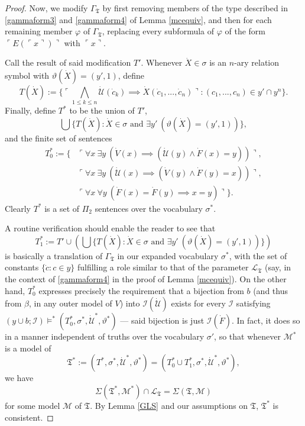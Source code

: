 \documentclass[12pt]{article}
\numberwithin{equation}{section}
\begin{document}
\begin{proof}
Now, we modify $\Gamma_{\mathfrak{T}}$ by first removing members of the type described in \ref{gammaform3} and \ref{gammaform4} of Lemma \ref{mcequiv}, and then for each remaining member $\varphi$ of $\Gamma_{\mathfrak{T}}$, replacing every subformula of $\varphi$ of the form $\ulcorner E(\ulcorner x \urcorner) \urcorner$ with $\ulcorner x \urcorner$. 

Call the result of said modification $T'$. Whenever $\dot{X} \in \sigma$ is an $n$-ary relation symbol with $\vartheta(\dot{X}) = (y', 1)$, define $$T(\dot{X}) := \{\ulcorner \bigwedge_{1 \leq k \leq n} \dot{\mathcal{U}}(\dot{c}_k) \implies \dot{X}(\dot{c}_1, ..., \dot{c}_n) \urcorner : (c_1, ..., c_n) \in y' \cap y^n\}.$$ Finally, define $T^*$ to be the union of $T'$, $$\bigcup \{T(\dot{X}) : \dot{X} \in \sigma \text{ and } \exists y' \ (\vartheta(\dot{X}) = (y', 1))\},$$ and the finite set of sentences
\begin{align*}
    T^*_0 := \{ & \ulcorner \forall x \ \exists y \ (\dot{V}(x) \implies (\dot{\mathcal{U}}(y) \wedge \dot{F}(x) = y)) \urcorner, \\
    & \ulcorner \forall x \ \exists y \ (\dot{\mathcal{U}}(x) \implies (\dot{V}(y) \wedge \dot{F}(y) = x)) \urcorner, \\
    & \ulcorner \forall x \ \forall y \ (\dot{F}(x) = \dot{F}(y) \implies x = y) \urcorner\} \text{.}
\end{align*}
Clearly $T^*$ is a set of $\Pi_2$ sentences over the vocabulary $\sigma^*$.

A routine verification should enable the reader to see that $$T^*_1 := T' \cup (\bigcup \{T(\dot{X}) : \dot{X} \in \sigma \text{ and } \exists y' \ (\vartheta(\dot{X}) = (y', 1))\})$$ is basically a translation of $\Gamma_{\mathfrak{T}}$ in our expanded vocabulary $\sigma^*$, with the set of constants $\{\dot{c} : c \in y\}$ fulfilling a role similar to that of the parameter $\mathcal{L}_{\mathfrak{T}}$ (say, in the context of \ref{gammaform4} in the proof of Lemma \ref{mcequiv}). On the other hand, $T^*_0$ expresses precisely the requirement that a bijection from $b$ (and thus from $\beta$, in any outer model of $V$) into $\mathcal{I}(\dot{\mathcal{U}})$ exists for every $\mathcal{I}$ satisfying $(y \cup b; \mathcal{I}) \models^* (T^*_0, \sigma^*,  \dot{\mathcal{U}}^*, \vartheta^*)$ --- said bijection is just $\mathcal{I}(\dot{F})$. In fact, it does so in a manner independent of truths over the vocabulary $\sigma'$, so that whenever $\mathcal{M}^*$ is a model of $$\mathfrak{T}^* := (T^*, \sigma^*, \dot{\mathcal{U}}^*, \vartheta^*) = (T^*_0 \cup T^*_1, \sigma^*,  \dot{\mathcal{U}}^*, \vartheta^*),$$ we have $$\Sigma(\mathfrak{T}^*, \mathcal{M}^*) \cap \mathcal{L}_{\mathfrak{T}} = \Sigma(\mathfrak{T}, \mathcal{M})$$ for some model $\mathcal{M}$ of $\mathfrak{T}$. By Lemma \ref{GLS} and our assumptions on $\mathfrak{T}$, $\mathfrak{T}^*$ is consistent. 


\end{proof}
\end{document}
